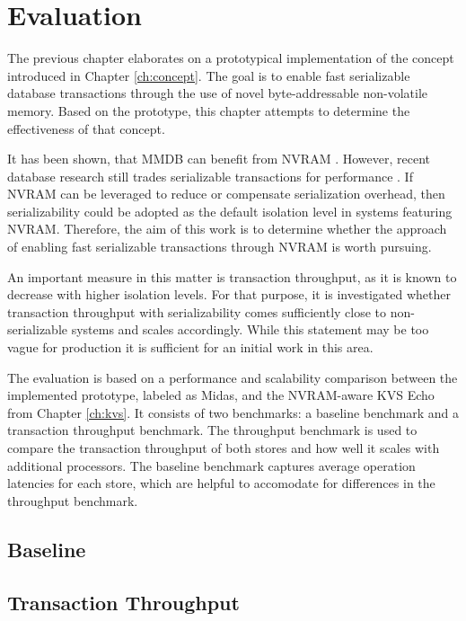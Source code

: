 \chapter{Evaluation}
\label{ch:eval}

The previous chapter elaborates on a prototypical implementation of the concept
introduced in Chapter \ref{ch:concept}. The goal is to enable fast serializable
database transactions through the use of novel byte-addressable non-volatile
memory. Based on the prototype, this chapter attempts to determine the
effectiveness of that concept.

It has been shown, that MMDB can benefit from NVRAM \cite{oukid2017data,
andrei2017sap}. However, recent database research still trades serializable
transactions for performance \cite{bailey2013exploring}. If NVRAM can be
leveraged to reduce or compensate serialization overhead, then serializability
could be adopted as the default isolation level in systems featuring NVRAM.
Therefore, the aim of this work is to determine whether the approach of enabling
fast serializable transactions through NVRAM is worth pursuing.

An important measure in this matter is transaction throughput, as it is known to
decrease with higher isolation levels. For that purpose, it is investigated
whether transaction throughput with serializability comes sufficiently close to
non-serializable systems and scales accordingly. While this statement may be too
vague for production it is sufficient for an initial work in this area.

The evaluation is based on a performance and scalability comparison between the
implemented prototype, labeled as Midas, and the NVRAM-aware KVS Echo from
Chapter \ref{ch:kvs}. It consists of two benchmarks: a baseline benchmark and a
transaction throughput benchmark. The throughput benchmark is used to compare
the transaction throughput of both stores and how well it scales with additional
processors. The baseline benchmark captures average operation latencies for each
store, which are helpful to accomodate for differences in the throughput
benchmark.




\section{Baseline}
\section{Transaction Throughput}

